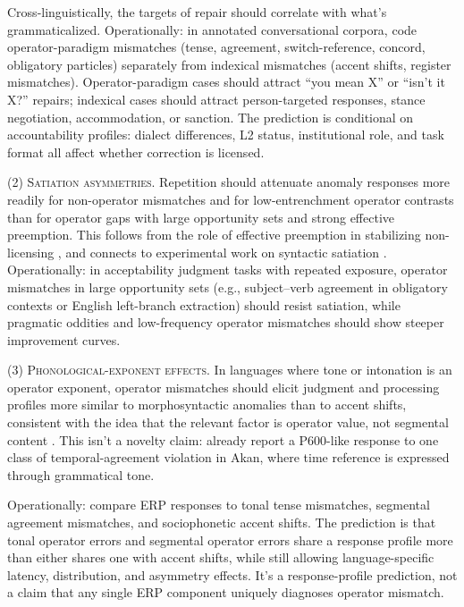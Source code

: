 \documentclass[12pt,letterpaper]{article}
\begin{document}
Cross-linguistically, the targets of repair should correlate with what's grammaticalized. Operationally: in annotated conversational corpora, code operator-paradigm mismatches (tense, agreement, switch-reference, concord, obligatory particles) separately from indexical mismatches (accent shifts, register mismatches). Operator-paradigm cases should attract \enquote{you mean X} or \enquote{isn't it X?} repairs; indexical cases should attract person-targeted responses, stance negotiation, accommodation, or sanction. The prediction is conditional on accountability profiles: dialect differences, L2 status, institutional role, and task format all affect whether correction is licensed.

\textsc{(2) Satiation asymmetries.} Repetition should attenuate anomaly responses more readily for non-operator mismatches and for low-entrenchment operator contrasts than for operator gaps with large opportunity sets and strong effective preemption. This follows from the role of effective preemption in stabilizing non-licensing \citep{bybee2006,bybee2010}, and connects to experimental work on syntactic satiation \citep{snyder2000,sprouse2009}. Operationally: in acceptability judgment tasks with repeated exposure, operator mismatches in large opportunity sets (e.g., subject--verb agreement in obligatory contexts or English left-branch extraction) should resist satiation, while pragmatic oddities and low-frequency operator mismatches should show steeper improvement curves.

\textsc{(3) Phonological-exponent effects.} In languages where tone or intonation is an operator exponent, operator mismatches should elicit judgment and processing profiles more similar to morphosyntactic anomalies than to accent shifts, consistent with the idea that the relevant factor is operator value, not segmental content \citep{hyman2011,ladd2008}. This isn't a novelty claim: \textcite{tsiwahetal2021} already report a P600-like response to one class of temporal-agreement violation in Akan, where time reference is expressed through grammatical tone.

Operationally: compare ERP responses to tonal tense mismatches, segmental agreement mismatches, and sociophonetic accent shifts. The prediction is that tonal operator errors and segmental operator errors share a response profile more than either shares one with accent shifts, while still allowing language-specific latency, distribution, and asymmetry effects. It's a response-profile prediction, not a claim that any single ERP component uniquely diagnoses operator mismatch.
\end{document}
